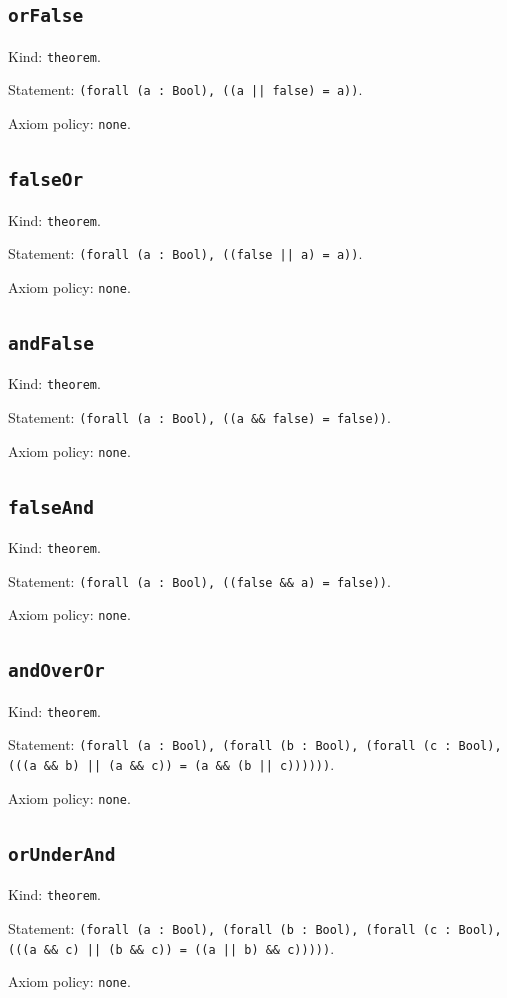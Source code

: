 \documentclass[11pt]{article}
\begin{document}
\subsection*{\texttt{orFalse}}
\noindent Kind: \texttt{theorem}.\par
\noindent Statement: \texttt{(forall (a : Bool), ((a || false) = a))}.\par
\noindent Axiom policy: \texttt{none}.\par
\subsection*{\texttt{falseOr}}
\noindent Kind: \texttt{theorem}.\par
\noindent Statement: \texttt{(forall (a : Bool), ((false || a) = a))}.\par
\noindent Axiom policy: \texttt{none}.\par
\subsection*{\texttt{andFalse}}
\noindent Kind: \texttt{theorem}.\par
\noindent Statement: \texttt{(forall (a : Bool), ((a \&\& false) = false))}.\par
\noindent Axiom policy: \texttt{none}.\par
\subsection*{\texttt{falseAnd}}
\noindent Kind: \texttt{theorem}.\par
\noindent Statement: \texttt{(forall (a : Bool), ((false \&\& a) = false))}.\par
\noindent Axiom policy: \texttt{none}.\par
\subsection*{\texttt{andOverOr}}
\noindent Kind: \texttt{theorem}.\par
\noindent Statement: \texttt{(forall (a : Bool), (forall (b : Bool), (forall (c : Bool), (((a \&\& b) || (a \&\& c)) = (a \&\& (b || c))))))}.\par
\noindent Axiom policy: \texttt{none}.\par
\subsection*{\texttt{orUnderAnd}}
\noindent Kind: \texttt{theorem}.\par
\noindent Statement: \texttt{(forall (a : Bool), (forall (b : Bool), (forall (c : Bool), (((a \&\& c) || (b \&\& c)) = ((a || b) \&\& c)))))}.\par
\noindent Axiom policy: \texttt{none}.\par
\end{document}
